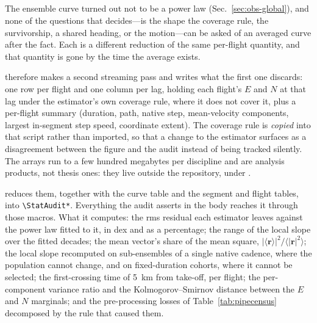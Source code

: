 \subsection{}
\begin{revblock}
The ensemble curve turned out not to be a power law (Sec.~\ref{sec:obs-global}), and
none of the questions that decides---is the shape the coverage rule, the survivorship, a
shared heading, or the motion---can be asked of an averaged curve after the fact. Each is
a different reduction of the same per-flight quantity, and that quantity is gone by the
time the average exists.

 therefore makes a second streaming pass and writes what the first one
discards: one row per flight and one column per lag, holding each flight's $E$ and $N$ at
that lag under the estimator's own coverage rule,  where it does not cover it,
plus a per-flight summary (duration, path, native step, mean-velocity components, largest
in-segment step speed, coordinate extent). The coverage rule is \emph{copied} into that
script rather than imported, so that a change to the estimator surfaces as a disagreement
between the figure and the audit instead of being tracked silently. The arrays run to a
few hundred megabytes per discipline and are analysis products, not thesis ones: they live
outside the repository, under .

 reduces them, together with the curve table
 and the segment and flight tables, into
\texttt{\textbackslash StatAudit*}. Everything the audit asserts in the body reaches it
through those macros. What it computes: the rms residual each estimator leaves against
the power law fitted to it, in dex and as a percentage; the range of the local slope over
the fitted decades; the mean vector's share of the mean square,
$|\langle\mathbf{r}\rangle|^2/\langle|\mathbf{r}|^2\rangle$; the local slope recomputed on
sub-ensembles of a single native cadence, where the population cannot change, and on
fixed-duration cohorts, where it cannot be selected; the first-crossing time of
\SI{5}{\kilo\metre} from take-off, per flight; the per-component variance ratio and the
Kolmogorov--Smirnov distance between the $E$ and $N$ marginals; and the pre-processing
losses of Table~\ref{tab:pipecensus} decomposed by the rule that caused them.


\end{revblock}
